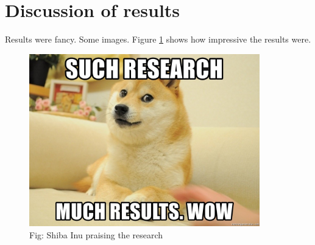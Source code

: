
\section{Discussion of results}
Results were fancy. Some images. Figure \ref{overflow} shows how impressive the results were.
\begin{figure}[!ht]
    \centering
    \includegraphics[width= 100mm]{images/wow_doge.jpg}
    \caption{Fig: Shiba Inu praising the research \label{overflow}}
\end{figure}
